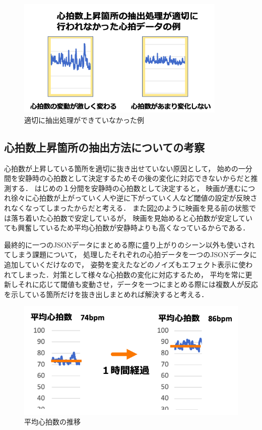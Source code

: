 \begin{figure}[H]
    \centering
    \includegraphics[width=10cm]{images/chapter4/miss.png}
    \caption{適切に抽出処理ができていなかった例}
    \label{kekka}
\end{figure}


\subsection{心拍数上昇箇所の抽出方法についての考察}
心拍数が上昇している箇所を適切に抜き出せていない原因として，
始めの一分間を安静時の心拍数として決定するためその後の変化に対応できないからだと推測する．
はじめの１分間を安静時の心拍数として決定すると，
映画が進むにつれ徐々に心拍数が上がっていく人や逆に下がっていく人など閾値の設定が反映されなくなってしまったからだと考える．
また図\ref{kekka2}のように映画を見る前の状態では落ち着いた心拍数で安定しているが，
映画を見始めると心拍数が安定していても興奮しているため平均心拍数が安静時よりも高くなっているからである．

最終的に一つのJSONデータにまとめる際に盛り上がりのシーン以外も使いされてしまう課題について，
処理したそれぞれの心拍データを一つのJSONデータに追加していくだけなので，
姿勢を変えたなどのノイズもエフェクト表示に使われてしまった．対策として様々な心拍数の変化に対応するため，
平均を常に更新しそれに応じて閾値も変動させ，データを一つにまとめる際には複数人が反応を示している箇所だけを抜き出しまとめれば解決すると考える． 

\begin{figure}[H]
    \centering
    \includegraphics[width=13cm]{images/chapter4/bpmave.png}
    \caption{平均心拍数の推移}
    \label{kekka2}
\end{figure}

